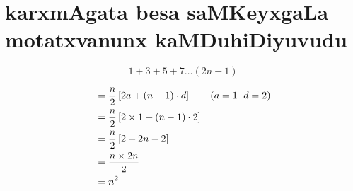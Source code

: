 \chapter{karxmAgata besa saMKeyxgaLa motatxvanunx kaMDuhiDiyuvudu}

$$
1+3+5+7\ldots(2n-1)
$$

\begin{align*}
&=\frac{n}{2}\left[2a+(n-1)\cdot d\right] \qquad \text{($a = 1$\; $d=2$)}\\
&=\frac{n}{2}\left[2\times 1 +(n-1)\cdot 2\right]\\
&=\frac{n}{2}\left[2+2n-2\right]\\
&=\frac{{n \times 2n}}{2}\\
&=n^2
\end{align*}
